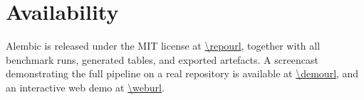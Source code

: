 \section{Availability}
\label{sec:availability}

Alembic is released under the MIT license at \url{\repourl}, together with all
benchmark runs, generated tables, and exported artefacts. A screencast
demonstrating the full pipeline on a real repository is available at
\url{\demourl}, and an interactive web demo at \url{\weburl}.%
